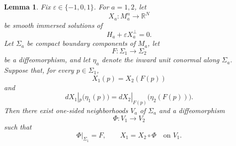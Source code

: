 \documentclass[11pt,a4paper]{article}
\numberwithin{equation}{section}
\newtheorem{lemma}[theorem]{Lemma}
\begin{document}
\begin{lemma}\label{lem:cauchy}
Fix $\varepsilon\in\{-1,0,1\}$.  For $a=1,2$, let
$$
        X_a:M_a^n\longrightarrow\mathbb R^N
$$
be smooth immersed solutions of
$$
        H_a+\varepsilon X_a^\perp=0.
$$
Let $\Sigma_a$ be compact boundary components of $M_a$, let
$$
        F:\Sigma_1\longrightarrow\Sigma_2
$$
be a diffeomorphism, and let $\eta_a$ denote the inward unit conormal
along $\Sigma_a$.  Suppose that, for every $p\in\Sigma_1$,
$$
        X_1(p)=X_2(F(p))
$$
and
$$
        dX_1|_p\bigl(\eta_1(p)\bigr)
        =
        dX_2|_{F(p)}\bigl(\eta_2(F(p))\bigr).
$$
Then there exist one-sided neighborhoods $V_a$ of $\Sigma_a$ and a
diffeomorphism
$$
        \Phi:V_1\longrightarrow V_2
$$
such that
$$
        \Phi|_{\Sigma_1}=F,
        \qquad
        X_1=X_2\circ\Phi
        \quad\text{on }V_1.
$$


\end{lemma}
\end{document}
